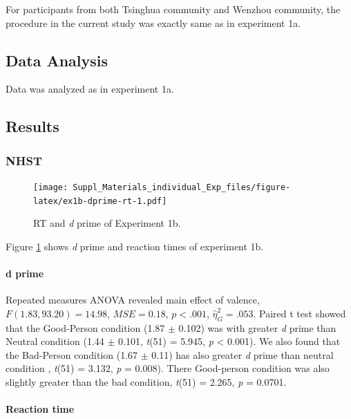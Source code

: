 \documentclass[
  english,
  man]{apa6}
\let\oldparagraph\paragraph
\renewcommand{\paragraph}[1]{\oldparagraph{#1}\mbox{}}
\begin{document}
For participants from both Tsinghua community and Wenzhou community, the procedure in the current study was exactly same as in experiment 1a.

\hypertarget{data-analysis-1}{%
\subsection{Data Analysis}\label{data-analysis-1}}

Data was analyzed as in experiment 1a.

\hypertarget{results-1}{%
\subsection{Results}\label{results-1}}

\hypertarget{nhst}{%
\subsubsection{NHST}\label{nhst}}

\begin{figure}
\centering
\texttt{[image: Suppl\_Materials\_individual\_Exp\_files/figure-latex/ex1b-dprime-rt-1.pdf]}
\caption{\label{fig:ex1b-dprime-rt}RT and \emph{d} prime of Experiment 1b.}
\end{figure}

Figure \ref{fig:ex1b-dprime-rt} shows \emph{d} prime and reaction times of experiment 1b.

\hypertarget{d-prime-2}{%
\paragraph{d prime}\label{d-prime-2}}

Repeated measures ANOVA revealed main effect of valence, \(F(1.83, 93.20) = 14.98\), \(\mathit{MSE} = 0.18\), \(p < .001\), \(\hat{\eta}^2_G = .053\). Paired t test showed that the Good-Person condition (1.87 \(\pm\) 0.102) was with greater \emph{d} prime than Neutral condition (1.44 \(\pm\) 0.101, \emph{t}(51) = 5.945, \emph{p} \textless{} 0.001). We also found that the Bad-Person condition (1.67 \(\pm\) 0.11) has also greater \emph{d} prime than neutral condition , \emph{t}(51) = 3.132, \emph{p} = 0.008). There Good-person condition was also slightly greater than the bad condition, \emph{t}(51) = 2.265, \emph{p} = 0.0701.

\hypertarget{reaction-time}{%
\paragraph{Reaction time}\label{reaction-time}}
\end{document}
